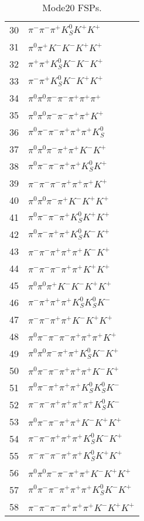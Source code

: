 \begin{table}[h!]
\begin{center}
\begin{tabular}{cl}
30 & $\pi^- \pi^- \pi^+ K_S^0 K^+ K^+ $ \\
31 & $\pi^0 \pi^+ K^- K^- K^+ K^+ $ \\
32 & $\pi^+ \pi^+ K_S^0 K^- K^- K^+ $ \\
33 & $\pi^- \pi^+ K_S^0 K^- K^+ K^+ $ \\
34 & $\pi^0 \pi^0 \pi^- \pi^- \pi^+ \pi^+ \pi^+ $ \\
35 & $\pi^0 \pi^0 \pi^- \pi^- \pi^+ \pi^+ K^+ $ \\
36 & $\pi^0 \pi^- \pi^- \pi^+ \pi^+ \pi^+ K_S^0 $ \\
37 & $\pi^0 \pi^0 \pi^- \pi^+ \pi^+ K^- K^+ $ \\
38 & $\pi^0 \pi^- \pi^- \pi^+ \pi^+ K_S^0 K^+ $ \\
39 & $\pi^- \pi^- \pi^- \pi^+ \pi^+ \pi^+ K^+ $ \\
40 & $\pi^0 \pi^0 \pi^- \pi^+ K^- K^+ K^+ $ \\
41 & $\pi^0 \pi^- \pi^- \pi^+ K_S^0 K^+ K^+ $ \\
42 & $\pi^0 \pi^- \pi^+ \pi^+ K_S^0 K^- K^+ $ \\
43 & $\pi^- \pi^- \pi^+ \pi^+ \pi^+ K^- K^+ $ \\
44 & $\pi^- \pi^- \pi^- \pi^+ \pi^+ K^+ K^+ $ \\
45 & $\pi^0 \pi^0 \pi^+ K^- K^- K^+ K^+ $ \\
46 & $\pi^- \pi^+ \pi^+ \pi^+ K_S^0 K_S^0 K^- $ \\
47 & $\pi^- \pi^- \pi^+ \pi^+ K^- K^+ K^+ $ \\
48 & $\pi^0 \pi^- \pi^- \pi^- \pi^+ \pi^+ \pi^+ K^+ $ \\
49 & $\pi^0 \pi^0 \pi^- \pi^+ \pi^+ K_S^0 K^- K^+ $ \\
50 & $\pi^0 \pi^- \pi^- \pi^+ \pi^+ \pi^+ K^- K^+ $ \\
51 & $\pi^0 \pi^- \pi^+ \pi^+ \pi^+ K_S^0 K_S^0 K^- $ \\
52 & $\pi^- \pi^- \pi^+ \pi^+ \pi^+ \pi^+ K_S^0 K^- $ \\
53 & $\pi^0 \pi^- \pi^- \pi^+ \pi^+ K^- K^+ K^+ $ \\
54 & $\pi^- \pi^- \pi^+ \pi^+ \pi^+ K_S^0 K^- K^+ $ \\
55 & $\pi^- \pi^- \pi^- \pi^+ \pi^+ K_S^0 K^+ K^+ $ \\
56 & $\pi^0 \pi^0 \pi^- \pi^- \pi^+ \pi^+ K^- K^+ K^+ $ \\
57 & $\pi^0 \pi^- \pi^- \pi^+ \pi^+ \pi^+ K_S^0 K^- K^+ $ \\
58 & $\pi^- \pi^- \pi^- \pi^+ \pi^+ \pi^+ K^- K^+ K^+ $ \\
\hline
\end{tabular}
\label{tab:Mode20FSPs}
\caption{Mode20 FSPs.}
\end{center}
\end{table}
